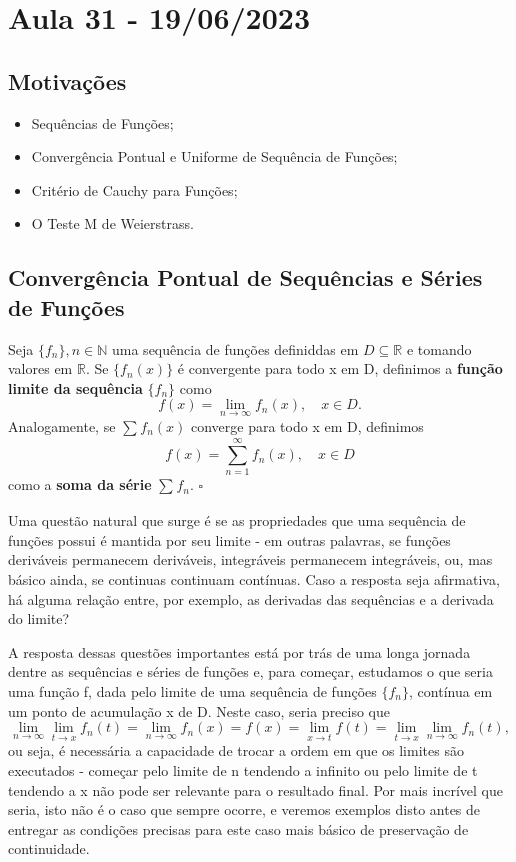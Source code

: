 \documentclass[../analysis_notes.tex]{subfiles}
\begin{document}
\section{Aula 31 - 19/06/2023}
\subsection{Motivações}
\begin{itemize}
	\item Sequências de Funções;
	\item Convergência Pontual e Uniforme de Sequência de Funções;
	\item Critério de Cauchy para Funções;
	\item O Teste M de Weierstrass.
\end{itemize}
\subsection{Convergência Pontual de Sequências e Séries de Funções}
\begin{def*}
	Seja \(\{f_{n}\}, n\in \mathbb{N}\) uma sequência de funções definiddas em \(D\subseteq \mathbb{R}\) e tomando valores em \(\mathbb{R}.\) Se \(\{f_{n}(x)\} \) é convergente para todo x em D, definimos a \textbf{função limite da sequência} \(\{f_{n}\} \) como
	\[
		f(x)=\lim_{n\to \infty}f_{n}(x),\quad x\in D.
	\]
	Analogamente, se \(\sum\limits_{}^{}f_{n}(x)\) converge para todo x em D, definimos
	\[
		f(x)=\sum\limits_{n=1}^{\infty}f_{n}(x),\quad x\in D
	\]
	como a \textbf{soma da série} \(\sum\limits_{}^{}f_{n}.\) \(\square\)
\end{def*}
Uma questão natural que surge é se as propriedades que uma sequência de funções possui é mantida por seu limite - em outras palavras, se funções deriváveis permanecem deriváveis, integráveis permanecem integráveis, ou, mas básico ainda, se continuas continuam contínuas. Caso a resposta seja afirmativa, há alguma relação entre, por exemplo, as derivadas das sequências e a derivada do limite?

A resposta dessas questões importantes está por trás de uma longa jornada dentre as sequências e séries de funções e, para começar, estudamos o que seria uma função f, dada pelo limite de uma sequência de funções \(\{f_{n}\}\), contínua em um ponto de acumulação x de D. Neste caso, seria preciso que
\[
	\lim_{n\to \infty}\lim_{t\to x}f_{n}(t)=\lim_{n\to \infty}f_{n}(x) = f(x)=\lim_{x\to t}f(t)=\lim_{t\to x}\lim_{n\to \infty}f_{n}(t),
\]
ou seja, é necessária a capacidade de trocar a ordem em que os limites são executados - começar pelo limite de n tendendo a infinito ou pelo limite de t tendendo a x não pode ser relevante para o resultado final. Por mais incrível que seria, isto não é o caso que sempre ocorre, e veremos exemplos disto antes de entregar as condições precisas para este caso mais básico de preservação de continuidade.
\end{document}
